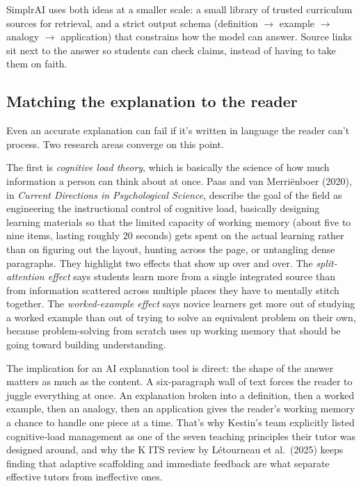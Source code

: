 \documentclass[11pt,letterpaper]{article}
\begin{document}
SimplrAI uses both ideas at a smaller scale: a small library of trusted
curriculum sources for retrieval, and a strict output schema (definition
$\to$ example $\to$ analogy $\to$ application) that constrains how the model
can answer. Source links sit next to the answer so students can check claims,
instead of having to take them on faith.

\subsection{Matching the explanation to the reader}

Even an accurate explanation can fail if it's written in language the reader
can't process. Two research areas converge on this point.

The first is \emph{cognitive load theory}, which is basically the science of
how much information a person can think about at once. Paas and van
Merri\"enboer (2020), in \textit{Current Directions in Psychological Science},
describe the goal of the field as engineering the instructional control of
cognitive load, basically designing learning materials so that the limited capacity of
working memory (about five to nine items, lasting roughly 20 seconds) gets
spent on the actual learning rather than on figuring out the layout, hunting
across the page, or untangling dense paragraphs. They highlight two effects
that show up over and over. The \emph{split-attention effect} says students
learn more from a single integrated source than from information scattered
across multiple places they have to mentally stitch together. The
\emph{worked-example effect} says novice learners get more out of studying a
worked example than out of trying to solve an equivalent problem on their own,
because problem-solving from scratch uses up working memory that should be
going toward building understanding.

The implication for an AI explanation tool is direct: the shape of the answer
matters as much as the content. A six-paragraph wall of text forces the reader
to juggle everything at once. An explanation broken into a definition, then a
worked example, then an analogy, then an application gives the reader's
working memory a chance to handle one piece at a time. That's why Kestin's
team explicitly listed cognitive-load management as one of the seven teaching
principles their tutor was designed around, and why the K ITS
review by L\'etourneau et al.\ (2025) keeps finding that adaptive scaffolding
and immediate feedback are what separate effective tutors from ineffective
ones.
\end{document}
